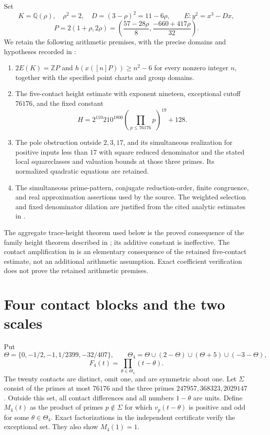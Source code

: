 \documentclass[11pt,a4paper]{article}
\newcommand{\Q}{\mathbb Q}\newcommand{\Z}{\mathbb Z}\newcommand{\HH}{\mathcal H}
\begin{document}
Set
\[
 K=\Q(\rho),\quad \rho^2=2,\quad D=(3-\rho)^2=11-6\rho,
 \qquad E:y^2=x^3-Dx,
\]
\[
 P=2(1+\rho,2\rho)
 =\left(\frac{57-28\rho}{8},\frac{-660+417\rho}{32}\right).
\]
We retain the following arithmetic premises, with the precise domains
and hypotheses recorded in \cite{Dependencies,Source,Weights}:
\begin{enumerate}
\item $2E(K)=\Z P$ and $h(x([n]P))\ge n^2-6$ for every nonzero
integer $n$, together with the specified point charts and group domains.
\item The five-contact height estimate with exponent nineteen,
exceptional cutoff $76176$, and the fixed constant
\[
 H=2^{110}210^{1800}\left(\prod_{p\le76176}p\right)^{19}+128.
\]
\item The pole obstruction outside $2,3,17$, and its simultaneous
realization for positive inputs less than $17$ with square reduced
denominator and the stated local squareclasses and valuation bounds
at those three primes. Its normalized quadratic equations are retained.
\item The simultaneous prime-pattern, conjugate reduction-order,
finite congruence, and real approximation assertions used by the source.
The weighted selection and fixed denominator dilation are justified
from the cited analytic estimates in \cite{Selection}.
\end{enumerate}
The aggregate trace-height theorem used below is the proved consequence
of the family height theorem described in \cite{Aggregate}; its additive
constant is ineffective. The contact amplification in \cite{Contacts}
is an elementary consequence of the retained five-contact estimate,
not an additional arithmetic assumption. Exact coefficient verification
does not prove the retained arithmetic premises.

\section{Four contact blocks and the two scales}
Put
\[
 \Theta=\{0,-1/2,-1,1/2399,-32/407\},\qquad
 \Theta_4=\Theta\cup(2-\Theta)\cup(\Theta+5)\cup(-3-\Theta),
\]
\[
                         F_4(t)=\prod_{\theta\in\Theta_4}(t-\theta).
\]
The twenty contacts are distinct, omit one, and are symmetric about one.
Let $\Sigma$ consist of the primes at most $76176$ and the three primes
$247957,368323,2029147$. Outside this set, all contact differences and
all numbers $1-\theta$ are units. Define $M_4(t)$ as the product of primes
$p\notin\Sigma$ for which $v_p(t-\theta)$ is positive and odd for some
$\theta\in\Theta_4$. Exact factorizations in the independent certificate
verify the exceptional set. They also show $M_4(1)=1$.
\end{document}
